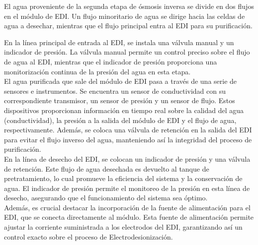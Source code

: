 El agua proveniente de la segunda etapa de ósmosis inversa se divide en dos flujos en el módulo de
EDI. Un flujo minoritario de agua se dirige hacia las celdas de agua a desechar, mientras que el flujo principal entra al EDI para su purificación.\\


En la línea principal de entrada al EDI, se instala una válvula manual y un indicador de presión. La válvula manual permite un control preciso sobre el flujo de agua al EDI, mientras que el indicador de presión proporciona una monitorización continua de la presión del agua en esta etapa.\\

El agua purificada que sale del módulo de EDI pasa a través de una serie de sensores e instrumentos. Se encuentra un sensor de conductividad con su correspondiente transmisor, un sensor de presión y un sensor de flujo. Estos dispositivos proporcionan información en tiempo real sobre la calidad del agua (conductividad), la presión a la salida del módulo de EDI y el flujo de agua, respectivamente. Además, se coloca una válvula de retención en la salida del EDI para evitar el flujo inverso del agua, manteniendo así la integridad del proceso de purificación.\\

En la línea de desecho del EDI, se colocan un indicador de presión y una válvula de retención. Este flujo de agua desechada es devuelto al tanque de pretratamiento, lo cual promueve la eficiencia del sistema y la conservación de agua. El indicador de presión permite el monitoreo de la presión en esta línea de desecho, asegurando que el funcionamiento del sistema sea óptimo.\\

Además, es crucial destacar la incorporación de la fuente de alimentación para el EDI, que se conecta directamente al módulo. Esta fuente de alimentación permite ajustar la corriente suministrada a los electrodos del EDI, garantizando así un control exacto sobre el proceso de Electrodesionización.\\
